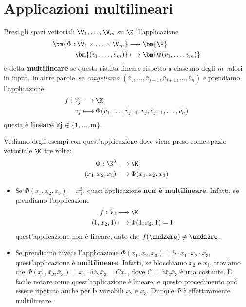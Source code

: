 \documentclass[11pt, a4paper, titlepage, oneside]{scrbook}
\begin{document}
\section{Applicazioni multilineari}
\begin{Definizione}
\label{def-app-multilineari}
Presi gli spazi vettoriali $\V_1, \ldots, \V_m$ su $\K$, l'applicazione
\begin{align*}
\bm{\Phi: \V_1 \times \ldots \times \V_m} &\longrightarrow \bm{\K}  \\
\bm{(v_1, \ldots, v_m)} &\longmapsto \bm{\Phi(v_1, \ldots, v_m)}
\end{align*}
è detta \textbf{multilineare} se questa risulta lineare rispetto a ciascuno degli $m$ valori in input. In altre parole, se \textit{congeliamo} $(\bar{v}_1, \ldots, \bar{v}_{j-1}, \bar{v}_{j+1}, \ldots, \bar{v}_n)$ e prendiamo l'applicazione
\begin{align*}
f:V_j &\longrightarrow \K \\
v_j &\longmapsto \Phi(\bar{v}_1, \ldots, \bar{v}_{j-1}, v_j, \bar{v}_{j+1}, \ldots, \bar{v}_n) 
\end{align*}
questa è \textbf{lineare} $\bm{\forall j \in \{1, \ldots, m\}}$.
\end{Definizione}

Vediamo degli esempi con quest'applicazione dove viene preso come spazio vettoriale $\K$ tre volte:
\begin{align*}
\Phi: \K^3 &\longrightarrow \K \\
(x_1, x_2, x_3) & \longmapsto \Phi(x_1, x_2, x_3)
\end{align*}

\begin{itemize}
    \item Se $\Phi(x_1, x_2, x_3) = x_1^3$, quest'applicazione \textbf{non è multilineare}. Infatti, se prendiamo l'applicazione
    \begin{align*}
    f:V_2 &\longrightarrow \K \\
    (1, x_2, 1) &\longmapsto \Phi(1, x_2, 1) = 1
    \end{align*}
    quest'applicazione non è lineare, dato che $f(\undzero) \neq \undzero$.
    \item Se prendiamo invece l'applicazione $\Phi(x_1, x_2, x_3) = 5 \cdot x_1 \cdot x_2 \cdot x_3$, quest'applicazione è \textbf{multilineare}. Infatti, se blocchiamo $\bar{x}_2$ e $\bar{x}_3$, troviamo che $\Phi(x_1, \bar{x}_2, \bar{x}_3) = x_1 \cdot 5\bar{x}_2 \bar{x}_3 = Cx_1$, dove $C = 5 \bar{x}_2 \bar{x}_3$ è una costante. È facile notare come quest'applicazione è lineare, e questo procedimento può essere ripetuto anche per le variabili $x_2$ e $x_3$. Dunque $\Phi$ è effettivamente multilineare.  
\end{itemize}
\end{document}
